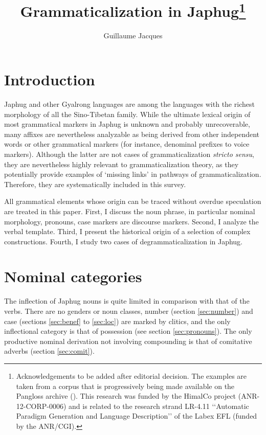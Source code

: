\documentclass[oldfontcommands,oneside,a4paper,11pt]{article}
\begin{document}
 
 \title{Grammaticalization in Japhug\footnote{Acknowledgements to be added after editorial decision. The examples are taken from a corpus that is progressively being made available on the Pangloss archive (\citealt{michailovsky14pangloss}). This research was funded by the HimalCo project (ANR-12-CORP-0006) and is related to the research strand LR-4.11 ‘‘Automatic Paradigm Generation and Language Description’’ of the Labex EFL (funded by the ANR/CGI). }}
 \author{Guillaume Jacques}
 \maketitle  
 \section{Introduction}
Japhug and other Gyalrong languages are among the languages with the richest morphology of all the Sino-Tibetan family. While the ultimate lexical origin of most grammatical markers in Japhug is unknown and probably unrecoverable, many affixes are nevertheless analyzable as being derived from other independent words or other grammatical markers (for instance, denominal prefixes to voice markers). Although the latter are not cases of grammaticalization \textit{stricto sensu}, they are nevertheless  highly relevant to grammaticalization theory, as they potentially provide examples of `missing links' in pathways of grammaticalization. Therefore, they are systematically included in this survey.

All grammatical elements whose origin can be traced without overdue speculation are treated in this paper. First, I discuss the noun phrase, in particular nominal morphology, pronouns, case markers are discourse markers. Second, I analyze the verbal template. Third, I present the historical origin of a selection of complex constructions. Fourth, I study two cases of degrammaticalization in Japhug.

 \section{Nominal categories} 
 
The inflection of Japhug nouns is quite limited in comparison with that of the verbs. There are no genders or noun classes, number (section \ref{sec:number}) and case (sections \ref{sec:benef} to \ref{sec:loc}) are marked by clitics, and the only inflectional category is that of possession (see section \ref{sec:pronouns}).  The only productive nominal derivation not involving compounding is that of comitative adverbs (section \ref{sec:comit}).
\end{document}
